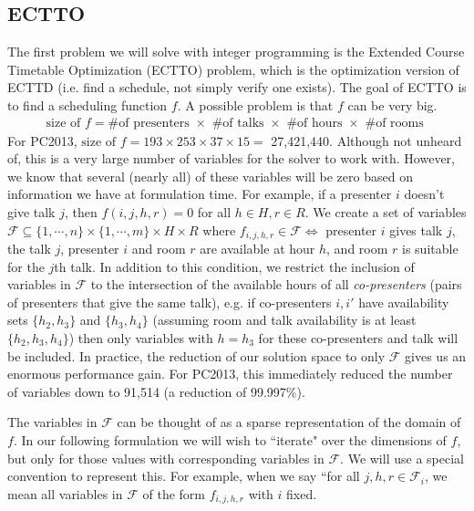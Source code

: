 \documentclass[]{article}
\theoremstyle{definition}
\theoremstyle{remark}
\numberwithin{equation}{section}
\begin{document}
\subsection{ECTTO}
The first problem we will solve with integer programming is the Extended Course Timetable Optimization (ECTTO) problem, which is the optimization version of ECTTD (i.e. find a schedule, not simply verify one exists). The goal of ECTTO is to find a scheduling function $f$. A possible problem is that $f$ can be very big.
\begin{gather*}
\text{size of } f = \text{\# of presenters } \times \text{ \# of talks } \times \text{ \# of hours } \times \text{ \# of rooms }
\end{gather*}
For PC2013, $\text{size of } f = 193 \times 253 \times 37 \times 15 = $ 27,421,440. Although not unheard of, this is a very large number of variables for the solver to work with. However, we know that several (nearly all) of these variables will be zero based on information we have at formulation time. For example, if a presenter $i$ doesn't give talk $j$, then $f(i,j,h,r) = 0$ for all $h \in H, r \in R$. We create a set of variables $\mathcal F \subseteq \{1,\cdots,n\} \times \{1,\cdots,m\} \times H \times R$ where $f_{i,j,h,r} \in \mathcal F \iff $ presenter $i$ gives talk $j$, the talk $j$, presenter $i$ and room $r$ are available at hour $h$, and room $r$ is suitable for the $j$th talk. In addition to this condition, we restrict the inclusion of variables in $\mathcal F$ to the intersection of the available hours of all \emph{co-presenters} (pairs of presenters that give the same talk), e.g. if co-presenters $i,i'$ have availability sets $\{h_2,h_3\}$ and $\{h_3,h_4\}$ (assuming room and talk availability is at least $\{h_2, h_3, h_4\}$) then only variables with $h=h_3$ for these co-presenters and talk will be included. In practice, the reduction of our solution space to only $\mathcal F$ gives us an enormous performance gain. For PC2013, this immediately reduced the number of variables down to 91,514 (a reduction of 99.997\%).

The variables in $\mathcal F$ can be thought of as a sparse representation of the domain of $f$. In our following formulation we will wish to ``iterate" over the dimensions of $f$, but only for those values with corresponding variables in $\mathcal F$. We will use a special convention to represent this. For example, when we say ``for all $j,h,r \in \mathcal F_i$, we mean all variables in $\mathcal F$ of the form $f_{i,j,h,r}$ with $i$ fixed.
\end{document}
